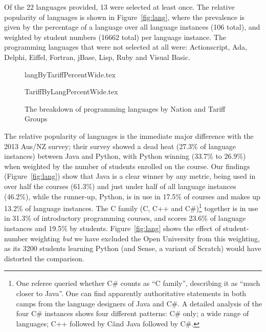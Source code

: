 \documentclass[english,submission]{programming}
\begin{document}
Of the 22 languages provided, 13 were selected at least once. The
relative popularity of languages is shown in Figure~\ref{fig:lang},
where the prevalence is given by the percentage of a language over all
language instances (106 total), and weighted by student numbers (16662
total) per language instance. The programming languages that were not
selected at all were: Actionscript, Ada, Delphi, Eiffel, Fortran,
jBase, Lisp, Ruby and Visual Basic.

\begin{figure}
\begin{center}
{langByTariffPercentWide.tex}
\end{center}%
%
\begin{center}
{TariffByLangPercentWide.tex}
\end{center}
\caption{The breakdown of programming languages by Nation and Tariff Groups\label{fig;LangTariff}}
\end{figure}

The relative popularity of languages is the immediate major difference
with the 2013 Aus/NZ survey; their survey showed a dead heat (27.3\%
of language instances) between Java and Python, with Python winning
(33.7\% to 26.9\%) when weighted by the number of students enrolled on
the course.  Our findings (Figure~\ref{fig:lang}) show that Java is a
clear winner by any metric, being used in over half the courses
(61.3\%) and just under half of all language instances (46.2\%), while
the runner-up, Python, is in use in 17.5\% of courses and makes up
13.2\% of language instances. The C family (C, C++ and C\#)\footnote{One referee queried whether C\# counts as ``C family'', describing it as ``much closer to Java''. One can find apparently authoritative statements in both camps from the language designers of Java and C\#. A detailed analysis of the four C\# instances shows four different patterns: C\# only; a wide range of languages; C++ followed by C\~ and Java followed by C\#.} together
is in use in 31.3\% of introductory programming courses, and scores
23.6\% of language instances and 19.5\% by
students. Figure~\ref{fig:lang} shows the effect of student-number
weighting \emph{but} we have excluded the Open University from this
weighting, as its 3200 students learning Python (and Sense, a variant
of Scratch) would have distorted the comparison.
\end{document}
